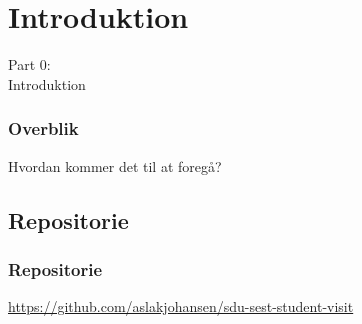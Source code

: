 \section{Introduktion}
\begin{frame}
  \vspace{25mm}
  \begin{center}
    \Huge{Part 0:\\Introduktion}
  \end{center}
\end{frame}

\begin{frame}
  \frametitle{Overblik}
  Hvordan kommer det til at foregå?
\end{frame}

\subsection{Repositorie}
\begin{frame}
    \frametitle{Repositorie}
    \begin{center}
      \url{https://github.com/aslakjohansen/sdu-sest-student-visit}
    \end{center}
\end{frame}




